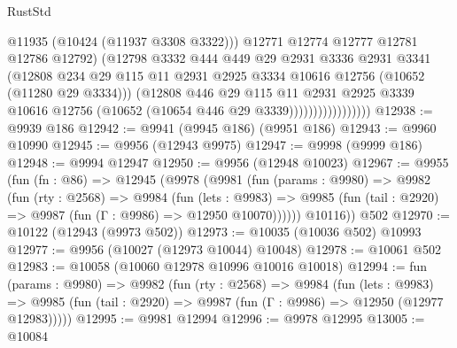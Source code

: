 \begin{lexlean}{RustStd}
\begin{coremodule}
                                  @11935
                                  (@10424 (@11937 @3308 @3322)))
                                @12771
                                @12774
                                @12777
                                @12781
                                @12786
                                @12792)
                              (@12798
                                @3332
                                @444
                                @449
                                @29
                                @2931
                                @3336
                                @2931
                                @3341
                                (@12808
                                  @234
                                  @29
                                  @115
                                  @11
                                  @2931
                                  @2925
                                  @3334
                                  @10616
                                  @12756
                                  (@10652 (@11280 @29 @3334)))
                                (@12808
                                  @446
                                  @29
                                  @115
                                  @11
                                  @2931
                                  @2925
                                  @3339
                                  @10616
                                  @12756
                                  (@10652 (@10654 @446 @29 @3339)))))))))))))))))
@12938 := @9939 @186
@12942 := @9941 (@9945 @186) (@9951 @186)
@12943 := @9960 @10990
@12945 := @9956 (@12943 @9975)
@12947 := @9998 (@9999 @186)
@12948 := @9994 @12947
@12950 := @9956 (@12948 @10023)
@12967 := @9955
    (fun (fn : @86) =>
    @12945
      (@9978
        (@9981
          (fun (params : @9980) =>
          @9982
            (fun (rty : @2568) =>
            @9984
              (fun (lets : @9983) =>
              @9985 (fun (tail : @2920) => @9987 (fun (Γ : @9986) => @12950 @10070))))))
        @10116))
    @502
@12970 := @10122 (@12943 (@9973 @502))
@12973 := @10035 (@10036 @502) @10993
@12977 := @9956 (@10027 (@12973 @10044) @10048)
@12978 := @10061 @502
@12983 := @10058 (@10060 @12978 @10996 @10016 @10018)
@12994 := fun (params : @9980) =>
  @9982
    (fun (rty : @2568) =>
    @9984
      (fun (lets : @9983) =>
      @9985 (fun (tail : @2920) => @9987 (fun (Γ : @9986) => @12950 (@12977 @12983)))))
@12995 := @9981 @12994
@12996 := @9978 @12995
@13005 := @10084

\end{coremodule}
\end{lexlean}
